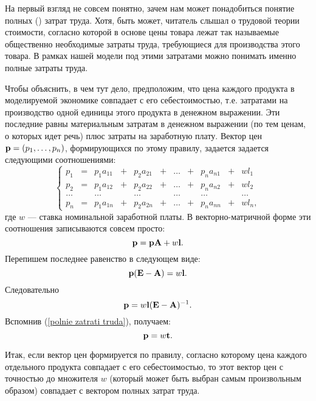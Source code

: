     На первый взгляд не совсем понятно, зачем нам может понадобиться
    понятие полных () затрат труда. Хотя, быть может, читатель
    слышал о трудовой теории стоимости, согласно которой в основе
    цены товара лежат так называемые общественно
    необходимые затраты труда, требующиеся для производства этого товара.
    В рамках нашей модели под этими затратами можно понимать именно
    полные затраты труда.

    Чтобы объяснить, в чем тут дело, предположим,
    что цена каждого продукта в моделируемой экономике совпадает с
    его себестоимостью, т.е. затратами  на производство одной единицы
    этого продукта в денежном выражении. Эти последние равны
    материальным затратам в денежном выражении (по тем ценам, о которых идет
    речь) плюс затраты на заработную плату. Вектор цен
    $\mathbf{p}=(p_{1},\ldots,p_{n})$, формирующихся по этому правилу,
     задается задается следующими соотношениями:
\begin{equation} \label{ceni-po-sebestoimosti}
 \left\{
\begin{array}{ccccccccccc}
  p_{1} & = & p_{1}a_{11} & + & p_{2}a_{21} & + & \ldots & + & p_{n}a_{n1} & + & wl_{1} \\
  p_{2} & = & p_{1}a_{12} & + & p_{2}a_{22} & + & \ldots & + & p_{n}a_{n2} & + & wl_{2}\\
  \ldots &  & \ldots &  & \ldots &  & \ldots &  & \ldots  &  & \ldots\\
  p_{n} & = & p_{1}a_{1n} & + & p_{2}a_{2n} & + & \ldots & + & p_{n}a_{nn} & + &  wl_{n},
\end{array}
\right.
\end{equation}
    где $w$ --- ставка номинальной заработной платы. В
    векторно-матричной форме эти соотношения записываются совсем
    просто:
    \[\mathbf{p}=\mathbf{p}\mathbf{A}+w\mathbf{l}.\]
    Перепишем последнее равенство в следующем виде:
    \[\mathbf{p}(\mathbf{E}-\mathbf{A})=w\mathbf{l}.\]
    Следовательно
    \[\mathbf{p}=w\mathbf{l}(\mathbf{E}-\mathbf{A})^{-1}.\]
    Вспомнив (\ref{polnie zatrati truda}), получаем:
    \[\mathbf{p}=w\mathbf{t}.\]

    Итак, если  вектор цен формируется по правилу, согласно которому
    цена каждого отдельного продукта совпадает с его себестоимостью,
    то этот вектор цен с точностью до множителя $w$
    (который может быть выбран самым произвольным образом)
    совпадает с вектором полных затрат труда.

